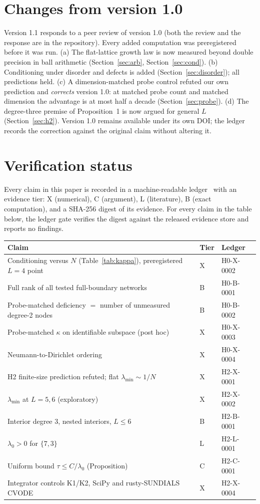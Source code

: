 \documentclass[11pt,a4paper]{article}
\begin{document}
\section*{Changes from version 1.0}
Version 1.1 responds to a peer review of version 1.0 (both the review and the response are in the repository).
Every added computation was preregistered before it was run. (a) The flat-lattice growth law is now measured beyond
double precision in ball arithmetic (Section~\ref{sec:arb}, Section~\ref{sec:cond}). (b) Conditioning under
disorder and defects is added (Section~\ref{sec:disorder}); all predictions held. (c) A dimension-matched
probe control refuted our own prediction and \emph{corrects} version 1.0: at matched probe count and matched
dimension the advantage is at most half a decade (Section~\ref{sec:probe}). (d) The degree-three premise of
Proposition~1 is now argued for general $L$ (Section~\ref{sec:h2}). Version 1.0 remains available under its own
DOI; the ledger records the correction against the original claim without altering it.

\section*{Verification status}
Every claim in this paper is recorded in a machine-readable ledger~\cite{TrackHRepo} with an evidence tier:
X (numerical), C (argument), L (literature), B (exact computation), and a SHA-256 digest of its evidence. For every
claim in the table below, the ledger gate verifies the digest against the released evidence store and reports no
findings.

\begin{center}\small
\begin{tabular}{lll}\toprule
Claim & Tier & Ledger \\ \midrule
Conditioning versus $N$ (Table~\ref{tab:kappa}), preregistered $L=4$ point & X & H0-X-0002 \\
Full rank of all tested full-boundary networks & B & H0-B-0001 \\
Probe-matched deficiency $=$ number of unmeasured degree-2 nodes & B & H0-B-0002 \\
Probe-matched $\kappa$ on identifiable subspace (post hoc) & X & H0-X-0003 \\
Neumann-to-Dirichlet ordering & X & H0-X-0004 \\
H2 finite-size prediction refuted; flat $\lambda_{\min}\sim1/N$ & X & H2-X-0001 \\
$\lambda_{\min}$ at $L=5,6$ (exploratory) & X & H2-X-0002 \\
Interior degree 3, nested interiors, $L\le6$ & B & H2-B-0001 \\
$\lambda_0>0$ for $\{7,3\}$ & L & H2-L-0001 \\
Uniform bound $\tau\le C/\lambda_0$ (Proposition) & C & H2-C-0001 \\
Integrator controls K1/K2, SciPy and rusty-SUNDIALS CVODE & X & H2-X-0004 \\ \bottomrule
\end{tabular}
\end{center}
\end{document}
